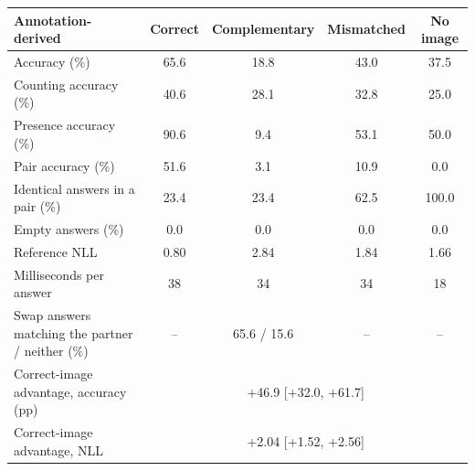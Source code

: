 \begin{tabular}{lcccc}\toprule Annotation-derived & Correct & Complementary & Mismatched & No image \\ \midrule
Accuracy (\%) & 65.6 & 18.8 & 43.0 & 37.5 \\
Counting accuracy (\%) & 40.6 & 28.1 & 32.8 & 25.0 \\
Presence accuracy (\%) & 90.6 & 9.4 & 53.1 & 50.0 \\
Pair accuracy (\%) & 51.6 & 3.1 & 10.9 & 0.0 \\
Identical answers in a pair (\%) & 23.4 & 23.4 & 62.5 & 100.0 \\
Empty answers (\%) & 0.0 & 0.0 & 0.0 & 0.0 \\
Reference NLL & 0.80 & 2.84 & 1.84 & 1.66 \\
Milliseconds per answer & 38 & 34 & 34 & 18 \\
\midrule Swap answers matching the partner / neither (\%) & -- & 65.6 / 15.6 & -- & -- \\
Correct-image advantage, accuracy (pp) & \multicolumn{4}{c}{+46.9 [+32.0, +61.7]} \\
Correct-image advantage, NLL & \multicolumn{4}{c}{+2.04 [+1.52, +2.56]} \\
\bottomrule\end{tabular}
